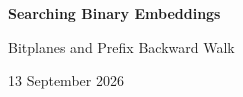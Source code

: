 \documentclass[11pt,a4paper]{article}
\begin{document}
\setlength{\abovedisplayskip}{7pt}
\setlength{\belowdisplayskip}{7pt}
{\Large\bfseries\color{Ink} Searching Binary Embeddings}\par
{\large Bitplanes and Prefix Backward Walk}\par
{\small 13 September 2026}\par





\end{document}
